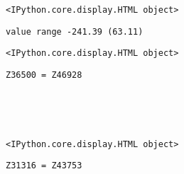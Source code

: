 \documentclass[11pt]{article}
\begin{document}
    
    \begin{verbatim}
<IPython.core.display.HTML object>
    \end{verbatim}

    
    \begin{Verbatim}[commandchars=\\\{\}]
value range -241.39 (63.11)

    \end{Verbatim}

    
    \begin{verbatim}
<IPython.core.display.HTML object>
    \end{verbatim}

    
    \begin{Verbatim}[commandchars=\\\{\}]
Z36500 = Z46928

    \end{Verbatim}

    \begin{center}
    \end{center}
    { \hspace*{\fill} \\}
    
    \begin{center}
    \end{center}
    { \hspace*{\fill} \\}
    
    
    \begin{verbatim}
<IPython.core.display.HTML object>
    \end{verbatim}

    
    \begin{Verbatim}[commandchars=\\\{\}]
Z31316 = Z43753

    \end{Verbatim}

    \begin{center}
    \end{center}
    { \hspace*{\fill} \\}
    
    \begin{center}
    \end{center}
    { \hspace*{\fill} \\}
    
\end{document}
